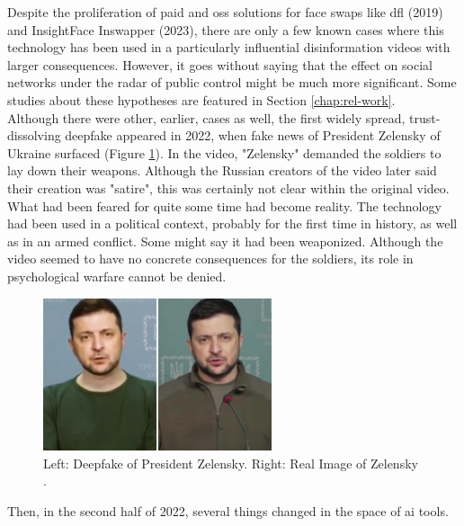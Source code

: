 \documentclass[
  a4paper,  %
  twoside,  %
  bibliography=totoc,
  headsepline,
  cleardoublepage=empty,
  parskip=half,
  draft=false
]{scrbook}
\begin{document}
Despite the proliferation of paid and \gls{oss} solutions for face swaps like \gls{dfl} (2019) and InsightFace Inswapper (2023), there are only a few known cases where this technology has been used in a particularly influential disinformation videos with larger consequences. However, it goes without saying that the effect on social networks under the radar of public control might be much more significant. Some studies about these hypotheses are featured in Section \ref{chap:rel-work}. \\
Although there were other, earlier, cases as well, the first widely spread, trust-dissolving deepfake appeared in 2022, when fake news of President Zelensky of Ukraine surfaced (Figure \ref{fig:zelensky-Deepfake}). In the video, "Zelensky" demanded the soldiers to lay down their weapons. Although the Russian creators of the video later said their creation was "satire", this was certainly not clear within the original video. What had been feared for quite some time had become reality. The technology had been used in a political context, probably for the first time in history, as well as in an armed conflict. Some might say it had been weaponized. Although the video seemed to have no concrete consequences for the soldiers, its role in psychological warfare cannot be denied.
\begin{figure}[h]
  \centering
  \includegraphics[width=0.6\textwidth]{./graphics/Zelensky.jpg}
  \caption{Left: Deepfake of President Zelensky. Right: Real Image of Zelensky \cite{universityofvirginiaZelenskyySurrenderHoax2022}.}
  \label{fig:zelensky-Deepfake}
\end{figure}
Then, in the second half of 2022, several things changed in the space of \gls{ai} tools.
\end{document}
